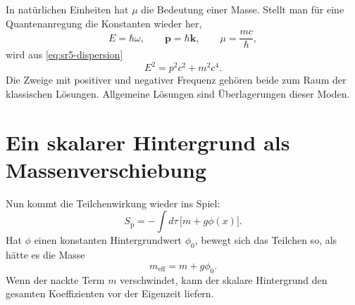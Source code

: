 In natürlichen Einheiten hat \(\mu\) die Bedeutung einer Masse. Stellt man für eine Quantenanregung die Konstanten wieder her, \begin{equation}
E=\hbar\omega,
\qquad
\mathbf{p}=\hbar\mathbf{k},
\qquad
\mu=\frac{mc}{\hbar},
\end{equation} wird aus \eqref{eq:sr5-dispersion} \begin{equation}
E^2=p^2c^2+m^2c^4.
\end{equation} Die Zweige mit positiver und negativer Frequenz gehören beide zum Raum der klassischen Lösungen. Allgemeine Lösungen sind Überlagerungen dieser Moden.

\begin{classroomqa}
\end{classroomqa}

\begin{classroomqa}
\end{classroomqa}

\section{Ein skalarer Hintergrund als Massenverschiebung}

Nun kommt die Teilchenwirkung wieder ins Spiel: \begin{equation}
S_{\mathrm p}
=
-\int d\tau\,
\bigl[m+g\phi(x)\bigr].
\label{eq:sr5-final-particle-action}
\end{equation} Hat \(\phi\) einen konstanten Hintergrundwert \(\phi_0\), bewegt sich das Teilchen so, als hätte es die Masse \begin{equation}
\boxed{
m_{\mathrm{eff}}=m+g\phi_0
}.
\label{eq:sr5-effective-mass}
\end{equation} Wenn der nackte Term \(m\) verschwindet, kann der skalare Hintergrund den gesamten Koeffizienten vor der Eigenzeit liefern.

